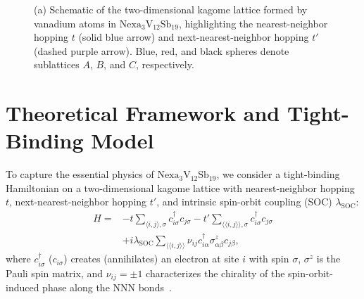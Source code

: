 \documentclass[aps,prb,reprint,superscriptaddress,amsmath,amssymb,citeautoscript]{revtex4-2}
\begin{document}
\begin{figure}[t]
\centering
{}
\caption{\label{fig:lattice}(a) Schematic of the two-dimensional kagome lattice formed by vanadium atoms in $\mathrm{Nexa}_{3}\mathrm{V}_{12}\mathrm{Sb}_{19}$, highlighting the nearest-neighbor hopping $t$ (solid blue arrow) and next-nearest-neighbor hopping $t'$ (dashed purple arrow). Blue, red, and black spheres denote sublattices $A$, $B$, and $C$, respectively.}
\end{figure}

\section{Theoretical Framework and Tight-Binding Model}
To capture the essential physics of $\mathrm{Nexa}_{3}\mathrm{V}_{12}\mathrm{Sb}_{19}$, we consider a tight-binding Hamiltonian on a two-dimensional kagome lattice with nearest-neighbor hopping $t$, next-nearest-neighbor hopping $t'$, and intrinsic spin-orbit coupling (SOC) $\lambda_{\text{SOC}}$:
\begin{align}
H ={} & -t \sum_{\langle i,j \rangle, \sigma} c_{i\sigma}^\dagger c_{j\sigma} - t' \sum_{\langle\langle i,j \rangle\rangle, \sigma} c_{i\sigma}^\dagger c_{j\sigma} \nonumber \\
& + i \lambda_{\text{SOC}} \sum_{\langle\langle i,j \rangle\rangle} \nu_{ij} c_{i\alpha}^\dagger \sigma^z_{\alpha\beta} c_{j\beta},
\label{eq:hamiltonian}
\end{align}
where $c_{i\sigma}^\dagger$ ($c_{i\sigma}$) creates (annihilates) an electron at site $i$ with spin $\sigma$, $\sigma^z$ is the Pauli spin matrix, and $\nu_{ij} = \pm 1$ characterizes the chirality of the spin-orbit-induced phase along the NNN bonds~\cite{Kane2005}. 
\end{document}
